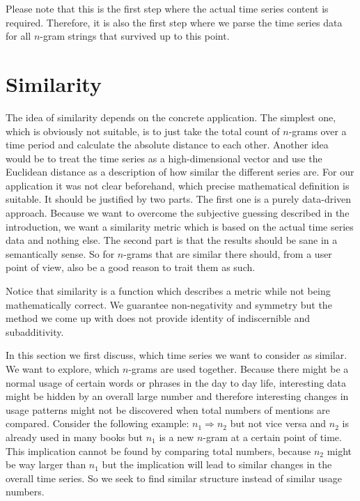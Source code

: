 Please note that this is the first step where the actual time series content is required. Therefore, it is also the first step where we parse the time series data for all $n$-gram strings that survived up to this point.


\section{Similarity}
\label{sec:baseline:sim}
The idea of similarity depends on the concrete application. The simplest one, which is obviously not suitable, is to just take the total count of $n$-grams over a time period and calculate the absolute distance to each other. Another idea would be to treat the time series as a high-dimensional vector and use the Euclidean distance as a description of how similar the different series are. For our application it was not clear beforehand, which precise mathematical definition is suitable. It should be justified by two parts. The first one is a purely data-driven approach. Because we want to overcome the subjective guessing described in the introduction, we want a similarity metric which is based on the actual time series data and nothing else. The second part is that the results should be sane in a semantically sense. So for $n$-grams that are similar there should, from a user point of view, also be a good reason to trait them as such.

Notice that similarity is a function which describes a metric while not being mathematically correct. We guarantee non-negativity and symmetry but the method we come up with does not provide identity of indiscernible and subadditivity.

In this section we first discuss, which time series we want to consider as similar. We want to explore, which $n$-grams are used together. Because there might be a normal usage of certain words or phrases in the day to day life, interesting data might be hidden by an overall large number and therefore interesting changes in usage patterns might not be discovered when total numbers of mentions are compared. Consider the following example: $n_1 \Rightarrow n_2$ but not vice versa and $n_2$ is already used in many books but $n_1$ is a new $n$-gram at a certain point of time. This implication cannot be found by comparing total numbers, because $n_2$ might be way larger than $n_1$ but the implication will lead to similar changes in the overall time series. So we seek to find similar structure instead of similar usage numbers.

